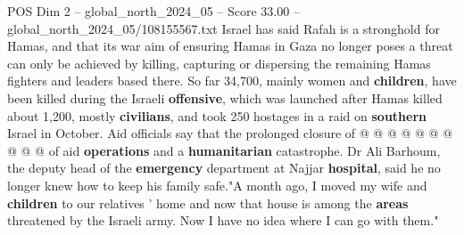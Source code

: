 \begin{textsample}{POS Dim 2 – global\_north\_2024\_05 – Score 33.00 – global\_north\_2024\_05/108155567.txt}
Israel has said Rafah is a stronghold for Hamas, and that its war aim of ensuring Hamas in Gaza no longer poses a threat can only be achieved by killing, capturing or dispersing the remaining Hamas fighters and leaders based there.
So far 34,700, mainly women and \textbf{children}, have been killed during the Israeli \textbf{offensive}, which was launched after Hamas killed about 1,200, mostly \textbf{civilians}, and took 250 hostages in a raid on \textbf{southern} Israel in October.
Aid officials say that the prolonged closure of @ @ @ @ @ @ @ @ @ @ of aid \textbf{operations} and a \textbf{humanitarian} catastrophe.
Dr Ali Barhoum, the deputy head of the \textbf{emergency} department at Najjar \textbf{hospital}, said he no longer knew how to keep his family safe."A month ago, I moved my wife and \textbf{children} to our relatives ' home and now that house is among the \textbf{areas} threatened by the Israeli army.
Now I have no idea where I can go with them."

\end{textsample}

